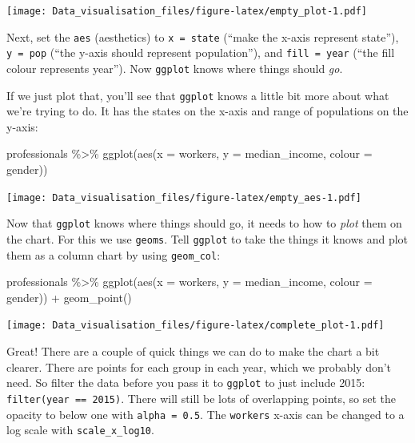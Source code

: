 \documentclass[
]{book}
\newenvironment{Shaded}{\begin{snugshade}}{\end{snugshade}}
\newcommand{\AttributeTok}[1]{\textcolor[rgb]{0.77,0.63,0.00}{#1}}
\newcommand{\FunctionTok}[1]{\textcolor[rgb]{0.00,0.00,0.00}{#1}}
\newcommand{\NormalTok}[1]{#1}
\newcommand{\SpecialCharTok}[1]{\textcolor[rgb]{0.00,0.00,0.00}{#1}}
\begin{document}
\texttt{[image: Data\_visualisation\_files/figure-latex/empty\_plot-1.pdf]}

Next, set the \texttt{aes} (aesthetics) to \texttt{x\ =\ state} (``make the x-axis represent state''), \texttt{y\ =\ pop} (``the y-axis should represent population''), and \texttt{fill\ =\ year} (``the fill colour represents year''). Now \texttt{ggplot} knows where things should \emph{go}.

If we just plot that, you'll see that \texttt{ggplot} knows a little bit more about what we're trying to do. It has the states on the x-axis and range of populations on the y-axis:

\begin{Shaded}
\begin{Highlighting}[]
\NormalTok{professionals }\SpecialCharTok{\%\textgreater{}\%} 
        \FunctionTok{ggplot}\NormalTok{(}\FunctionTok{aes}\NormalTok{(}\AttributeTok{x =}\NormalTok{ workers,}
                   \AttributeTok{y =}\NormalTok{ median\_income,}
                   \AttributeTok{colour =}\NormalTok{ gender))}
\end{Highlighting}
\end{Shaded}

\texttt{[image: Data\_visualisation\_files/figure-latex/empty\_aes-1.pdf]}

Now that \texttt{ggplot} knows where things should go, it needs to how to \emph{plot} them on the chart. For this we use \texttt{geoms}. Tell \texttt{ggplot} to take the things it knows and plot them as a column chart by using \texttt{geom\_col}:

\begin{Shaded}
\begin{Highlighting}[]
\NormalTok{professionals }\SpecialCharTok{\%\textgreater{}\%}
        \FunctionTok{ggplot}\NormalTok{(}\FunctionTok{aes}\NormalTok{(}\AttributeTok{x =}\NormalTok{ workers,}
                   \AttributeTok{y =}\NormalTok{ median\_income,}
                   \AttributeTok{colour =}\NormalTok{ gender)) }\SpecialCharTok{+} 
        \FunctionTok{geom\_point}\NormalTok{()}
\end{Highlighting}
\end{Shaded}

\texttt{[image: Data\_visualisation\_files/figure-latex/complete\_plot-1.pdf]}

Great! There are a couple of quick things we can do to make the chart a bit clearer. There are points for each group in each year, which we probably don't need. So filter the data before you pass it to \texttt{ggplot} to just include 2015: \texttt{filter(year\ ==\ 2015)}. There will still be lots of overlapping points, so set the opacity to below one with \texttt{alpha\ =\ 0.5}. The \texttt{workers} x-axis can be changed to a log scale with \texttt{scale\_x\_log10}.
\end{document}
